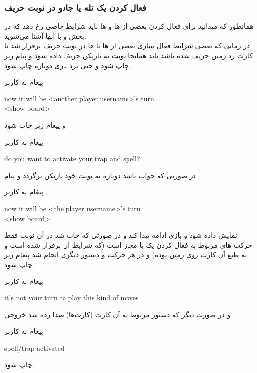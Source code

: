 \documentclass[]{article}
\begin{document}
\subsubsection*{{\titr فعال کردن یک تله یا جادو در نوبت حریف}}
همانطور که میدانید برای فعال کردن بعضی از  ها و  ها باید 
شرایط خاصی رخ دهد که در بخش  و  با آنها آشنا می‌شوید.
\\
در زمانی که بعضی شرایط فعال سازی بعضی از  ها یا  ها در 
نوبت حریف برقرار شد یا کارت  رد زمین حریف  شده باشد 
باید همانجا نوبت به بازیکن حریف داده شود و پیام زیر چاپ شود و حتی برد بازی 
دوباره چاپ شود.
\begin{mybox}[colback=yellow]{پیغام به کاربر}
	\begin{latin}	
		now it will be <another player username>’s turn \\
		<show board>
	\end{latin}
\end{mybox}
و پیغام زیر چاپ شود
\begin{mybox}[colback=yellow]{پیغام به کاربر}
	\begin{latin}	
	    do you want to activate your trap and spell?
	\end{latin}
\end{mybox}
در صورتی که جواب  باشد دوباره به نوبت خود بازیکن برگردد و پیام 

\begin{mybox}[colback=yellow]{پیغام به کاربر}
	\begin{latin}	
		now it will be <the player username>’s turn \\
		<show board>
	\end{latin}
\end{mybox}
نمایش داده شود و بازی ادامه پیدا کند و در صورتی که 
چاپ شد در آن نوبت فقط حرکت های مربوط به فعال کردن یک  یا  
مجاز است (که شرایط آن برقرار شده است و به طبع آن کارت روی زمین بوده) و در 
هر حرکت و دستور دیگری انجام شد پیغام زیر چاپ شود.
\begin{mybox}[colback=yellow]{پیغام به کاربر}
	\begin{latin}	
		it’s not your turn to play this kind of moves
	\end{latin}
\end{mybox}
و در صورت دیگر که دستور  مربوط به آن کارت (کارت‌ها) صدا زده شد 
خروجی 
\begin{mybox}[colback=yellow]{پیغام به کاربر}
	\begin{latin}	
		spell/trap activated
	\end{latin}
\end{mybox}
چاپ شود.
\end{document}

